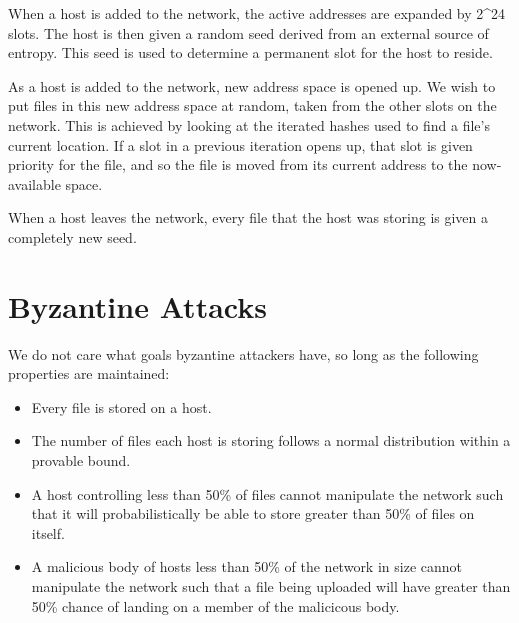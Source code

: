 \documentclass[twocolumn]{article}
\begin{document}
When a host is added to the network, the active addresses are expanded by 2^24 slots.
The host is then given a random seed derived from an external source of entropy.
This seed is used to determine a permanent slot for the host to reside.

As a host is added to the network, new address space is opened up.
We wish to put files in this new address space at random, taken from the other slots on the network.
This is achieved by looking at the iterated hashes used to find a file's current location.
If a slot in a previous iteration opens up, that slot is given priority for the file, and so the file is moved from its current address to the now-available space.

When a host leaves the network, every file that the host was storing is given a completely new seed.

\section{Byzantine Attacks}
We do not care what goals byzantine attackers have, so long as the following properties are maintained:
\begin{itemize}
	\item Every file is stored on a host.
	\item The number of files each host is storing follows a normal distribution within a provable bound.
	\item A host controlling less than 50\% of files cannot manipulate the network such that it will probabilistically be able to store greater than 50\% of files on itself.
	\item A malicious body of hosts less than 50\% of the network in size cannot manipulate the network such that a file being uploaded will have greater than 50\% chance of landing on a member of the malicicous body.
\end{itemize}

\end{document}
